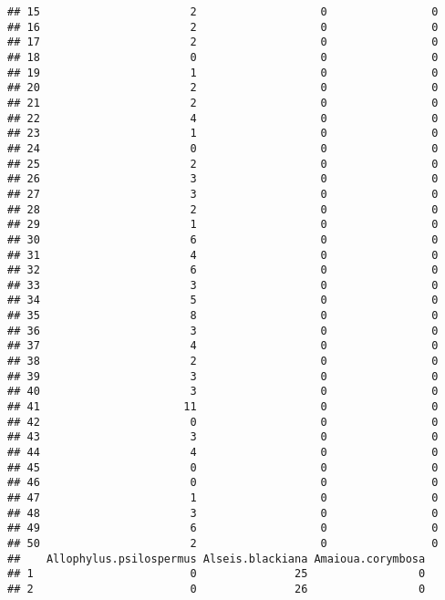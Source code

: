 \documentclass[
]{article}
\begin{document}
\begin{verbatim}
## 15                       2                   0                0
## 16                       2                   0                0
## 17                       2                   0                0
## 18                       0                   0                0
## 19                       1                   0                0
## 20                       2                   0                0
## 21                       2                   0                0
## 22                       4                   0                0
## 23                       1                   0                0
## 24                       0                   0                0
## 25                       2                   0                0
## 26                       3                   0                0
## 27                       3                   0                0
## 28                       2                   0                0
## 29                       1                   0                0
## 30                       6                   0                0
## 31                       4                   0                0
## 32                       6                   0                0
## 33                       3                   0                0
## 34                       5                   0                0
## 35                       8                   0                0
## 36                       3                   0                0
## 37                       4                   0                0
## 38                       2                   0                0
## 39                       3                   0                0
## 40                       3                   0                0
## 41                      11                   0                0
## 42                       0                   0                0
## 43                       3                   0                0
## 44                       4                   0                0
## 45                       0                   0                0
## 46                       0                   0                0
## 47                       1                   0                0
## 48                       3                   0                0
## 49                       6                   0                0
## 50                       2                   0                0
##    Allophylus.psilospermus Alseis.blackiana Amaioua.corymbosa
## 1                        0               25                 0
## 2                        0               26                 0

\end{verbatim}
\end{document}
